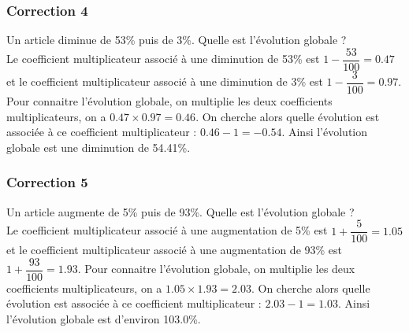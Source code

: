 \documentclass[15pt, mathserif]{beamer}
\begin{document}
\begin{frame}
\vspace{-10mm}
	\frametitle{Correction 4}
\vspace*{1cm} Un article diminue de 53\% puis de 3\%. Quelle est l'évolution globale ? \\ Le coefficient multiplicateur associé à une diminution de 53\% est $1-\dfrac{53}{100} = 0.47$ et le coefficient multiplicateur associé à une diminution de 3\% est $1-\dfrac{3}{100} = 0.97$. Pour connaitre l'évolution globale, on multiplie les deux coefficients multiplicateurs, on a $ 0.47 \times 0.97=0.46$. On cherche alors quelle évolution est associée à ce coefficient multiplicateur : $0.46-1 =-0.54$. Ainsi l'évolution globale est une diminution de 54.41\%. 
 \begin{center} 
 \end{center}\end{frame}


\begin{frame}
\vspace{-10mm}
	\frametitle{Correction 5}
\vspace*{1cm} Un article augmente de 5\% puis de 93\%. Quelle est l'évolution globale ? \\ Le coefficient multiplicateur associé à une augmentation de 5\% est $1+\dfrac{5}{100} = 1.05$ et le coefficient multiplicateur associé à une augmentation de 93\% est $1+\dfrac{93}{100} = 1.93$. Pour connaitre l'évolution globale, on multiplie les deux coefficients multiplicateurs, on a $ 1.05 \times 1.93=2.03$. On cherche alors quelle évolution est associée à ce coefficient multiplicateur : $2.03-1 =1.03$. Ainsi l'évolution globale est d'environ 103.0\%. 
 \begin{center} 
 \end{center}\end{frame}
\end{document}
